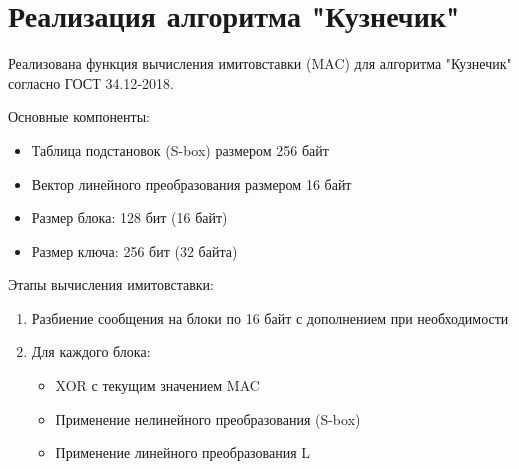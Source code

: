\documentclass[a4paper, 14pt]{extarticle}
\begin{document}
\section{Реализация алгоритма "Кузнечик"}
Реализована функция вычисления имитовставки (MAC) для алгоритма "Кузнечик" согласно ГОСТ 34.12-2018. 

Основные компоненты:
\begin{itemize}
    \item Таблица подстановок (S-box) размером 256 байт
    \item Вектор линейного преобразования размером 16 байт
    \item Размер блока: 128 бит (16 байт)
    \item Размер ключа: 256 бит (32 байта)
\end{itemize}

Этапы вычисления имитовставки:
\begin{enumerate}
    \item Разбиение сообщения на блоки по 16 байт с дополнением при необходимости
    \item Для каждого блока:
    \begin{itemize}
        \item XOR с текущим значением MAC
        \item Применение нелинейного преобразования (S-box)
        \item Применение линейного преобразования L
    \end{itemize}
\end{enumerate}
\end{document}
